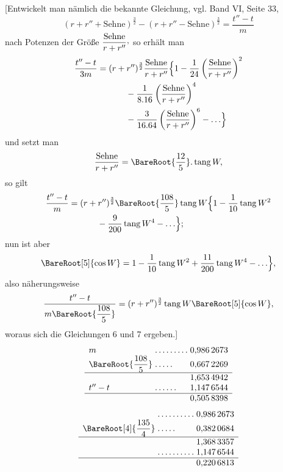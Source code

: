 [Entwickelt man nämlich die bekannte Gleichung, vgl. Band VI, Seite 33,
\[
(r+r''+\text{Sehne})^{\frac{3}{2}}-(r+r''-\text{Sehne})^{\frac{3}{2}}=\frac{t''-t}{m}
\]
nach Potenzen der Größe \(\dfrac{\text{Sehne}}{r+r''}\mathpunct{\raisebox{.45ex}{,}}\) so erhält man
\[
\begin{aligned}
\frac{t''-t}{3m}={}&(r+r'')^{\frac{3}{2}}\frac{\text{Sehne}}{r+r''}\Bigl\{1-\frac{1}{24}\left(\frac{\text{Sehne}}{r+r''}\right)^2\\
&\qquad{}-\frac{1}{8\mathord{.}16}\left(\frac{\text{Sehne}}{r+r''}\right)^4\\
&\qquad{}-\frac{3}{16\mathord{.}64}\left(\frac{\text{Sehne}}{r+r''}\right)^6-\mathord{.}\,\mathord{.}\,\mathord{.}\Bigr\}
\end{aligned}
\]
und setzt man
\[
\frac{\text{Sehne}}{r+r''}=\BareRoot{\frac{12}{5}}\mathord{.}\operatorname{tang}W,
\]
so gilt
\[
\begin{aligned}
\frac{t''-t}{m}={}&(r+r'')^{\frac{3}{2}}\BareRoot{\frac{108}{5}}\operatorname{tang}W\Bigl\{1-\frac{1}{10}\operatorname{tang}W^2\\
&\qquad{}-\frac{9}{200}\operatorname{tang}W^4-\mathord{.}\,\mathord{.}\,\mathord{.}\Bigr\};
\end{aligned}
\]
nun ist aber
\[
\BareRoot[5]{\cos W}=1-\frac{1}{10}\operatorname{tang}W^2+\frac{11}{200}\operatorname{tang}W^4-\mathord{.}\,\mathord{.}\,\mathord{.}\Bigr\},
\]
also näherungsweise
\[
\frac{t''-t}{m\BareRoot{\dfrac{108}{5}}}=(r+r'')^{\frac{3}{2}}\operatorname{tang}W\BareRoot[5]{\cos W},
\]
woraus sich die Gleichungen 6 und 7 ergeben.]
\[
\begin{array}{l@{\;}l@{\;}r}
m&\mathord{.}\,\mathord{.}\,\mathord{.}\,\mathord{.}\,\mathord{.}\,\mathord{.}\,\mathord{.}\,\mathord{.}\,\mathord{.}&0{,}986\,2673\\
\BareRoot{\dfrac{108}{5}}&\mathord{.}\,\mathord{.}\,\mathord{.}\,\mathord{.}\,\mathord{.}&0{,}667\,2269\\[3pt]\hline
&&1{,}653\,4942\\
t''-t&\mathord{.}\,\mathord{.}\,\mathord{.}\,\mathord{.}\,\mathord{.}\,\mathord{.}&1{,}147\,6544\\\hline
&&0{,}505\,8398
\end{array}
\]
\[
\begin{array}{l@{\;}l@{\;}r}
&\mathord{.}\,\mathord{.}\,\mathord{.}\,\mathord{.}\,\mathord{.}\,\mathord{.}\,\mathord{.}\,\mathord{.}\,\mathord{.}\,\mathord{.}&0{,}986\,2673\\
\BareRoot[4]{\dfrac{135}{4}}&\mathord{.}\,\mathord{.}\,\mathord{.}\,\mathord{.}\,\mathord{.}&0{,}382\,0684\\[3pt]\hline
&&1{,}368\,3357\\
&\mathord{.}\,\mathord{.}\,\mathord{.}\,\mathord{.}\,\mathord{.}\,\mathord{.}\,\mathord{.}\,\mathord{.}\,\mathord{.}\,\mathord{.}&1{,}147\,6544\\\hline
&&0{,}220\,6813
\end{array}
\]
